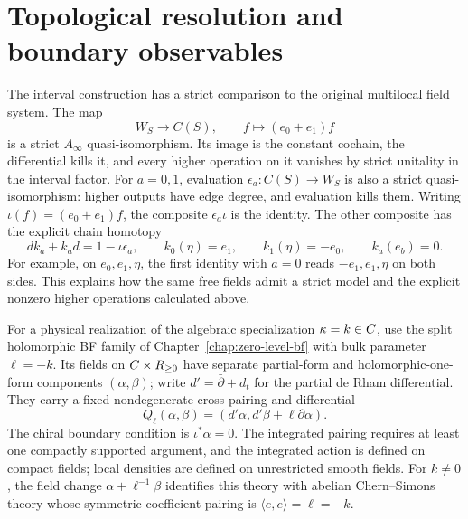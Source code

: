 \clearpage
\section{Topological resolution and boundary observables}

The interval construction has a strict comparison to the original
multilocal field system.  The map
\[
 W_S\longrightarrow C(S),\qquad f\longmapsto(e_0+e_1)f
\]
is a strict $A_\infty$ quasi-isomorphism.  Its image is the constant
cochain, the differential kills it, and every higher operation on it
vanishes by strict unitality in the interval factor.  For $a=0,1$, evaluation $\epsilon_a:C(S)\to W_S$ is also a strict
quasi-isomorphism: higher outputs have edge degree, and evaluation kills them.
Writing $\iota(f)=(e_0+e_1)f$, the composite $\epsilon_a\iota$ is the
identity.  The other composite has the explicit chain homotopy
\[
 dk_a+k_ad=1-\iota\epsilon_a,\qquad
 k_0(\eta)=e_1,\qquad k_1(\eta)=-e_0,\qquad k_a(e_b)=0.
\]
For example, on $e_0,e_1,\eta$, the first identity with $a=0$
reads $-e_1,e_1,\eta$ on both sides.  This explains
how the same free fields admit a strict model and the explicit nonzero
higher operations calculated above.

For a physical realization of the algebraic specialization
$\kappa=k\in C$, use the split holomorphic BF family of
Chapter~\ref{chap:zero-level-bf} with bulk parameter $\ell=-k$.
Its fields on $C\times R_{\ge0}$ have separate partial-form and
holomorphic-one-form components $(\alpha,\beta)$; write
$d'=\bar\partial+d_t$ for the partial de Rham differential.
They carry a fixed
nondegenerate cross pairing and differential
\[
 Q_\ell(\alpha,\beta)=(d'\alpha,d'\beta+\ell\partial\alpha).
\]
The chiral boundary condition is $\iota^*\alpha=0$.  The integrated
pairing requires at least one compactly supported argument, and the
integrated action is defined on compact fields; local densities are
defined on unrestricted smooth fields.
For $k\ne0$, the field change
$\alpha+\ell^{-1}\beta$ identifies this theory with abelian
Chern--Simons theory whose symmetric coefficient pairing is
$\langle e,e\rangle=\ell=-k$.

